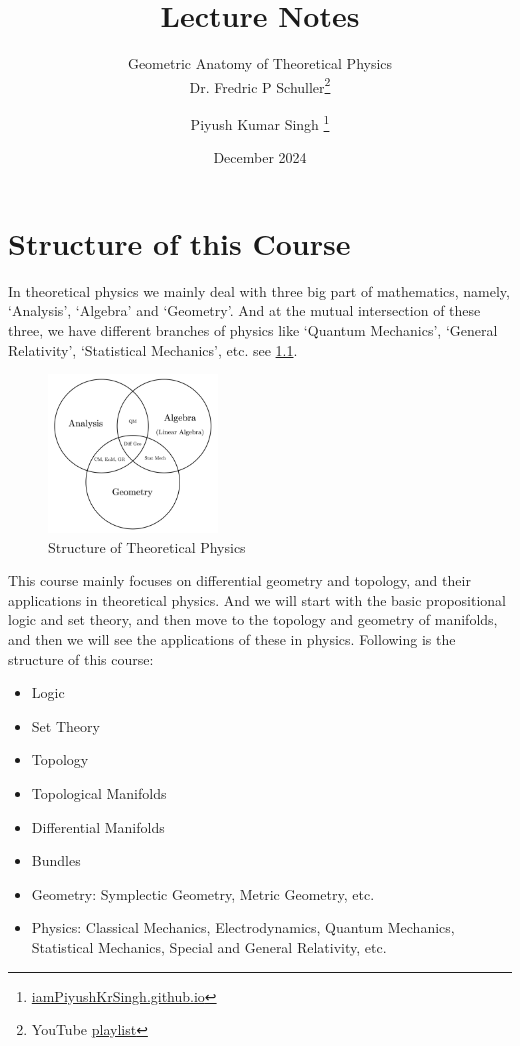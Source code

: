 \documentclass[11pt, oneside]{scrbook}
\title{
    \Huge Lecture Notes
}
\subtitle{
    \huge Geometric Anatomy of Theoretical Physics \\[10pt]
    \LARGE\normalfont\sffamily Dr. Fredric P Schuller\thanks{YouTube \href{https://youtube.com/playlist?list=PLPH7f_7ZlzxTi6kS4vCmv4ZKm9u8g5yic&si=Uy5ciENkuiTlvx6X}{playlist}}
}
\author{
\Large Piyush Kumar Singh \thanks{{\href{https://iampiyushkrsingh.github.io}{iamPiyushKrSingh.github.io}}}
}
\date{
    \large December 2024
}
\newcommand{\0}{\emptyset}
\begin{document}
\frontmatter
\begin{titlepage}
	\let\newpage\relax
	\singhtitle
\end{titlepage}

\chapter{Structure of this Course}
\noindent In theoretical physics we mainly deal with three big part of mathematics, namely, `Analysis', `Algebra' and `Geometry'. And at the mutual intersection of these three, we have different branches of physics like `Quantum Mechanics', `General Relativity', `Statistical Mechanics', etc. see \cref{fig:structure}.

\begin{figure}[H]
	\centering
	\includegraphics[width=0.4\textwidth]{lec01-math_struct.png}
	\caption{Structure of Theoretical Physics}
	\label{fig:structure}
\end{figure}\noindent
This course mainly focuses on differential geometry and topology, and their applications in theoretical physics. And we will start with the basic propositional logic and set theory, and then move to the topology and geometry of manifolds, and then we will see the applications of these in physics. Following is the structure of this course:

\begin{itemize}
	\item Logic
	\item Set Theory
	\item Topology
	\item Topological Manifolds
	\item Differential Manifolds
	\item Bundles
	\item Geometry: Symplectic Geometry, Metric Geometry, etc.
	\item Physics: Classical Mechanics, Electrodynamics, Quantum Mechanics, Statistical Mechanics, Special and General Relativity, etc.
\end{itemize}


\tableofcontents
{}

\mainmatter








\end{document}
